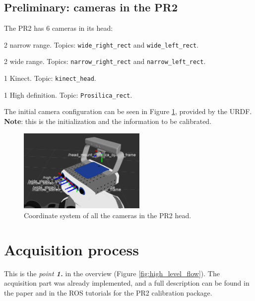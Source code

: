 \subsection*{Preliminary: cameras in the PR2}

The PR2 has 6 cameras in its head:
\begin{itemize*}
 \item 2 narrow range. Topics: \texttt{wide\_right\_rect} and \texttt{wide\_left\_rect}.
 \item 2 wide range. Topics: \texttt{narrow\_right\_rect} and \texttt{narrow\_left\_rect}.
 \item 1 Kinect. Topic: \texttt{kinect\_head}.
 \item 1 High definition. Topic: \texttt{Prosilica\_rect}.
\end{itemize*}

\noindent
The initial camera configuration can be seen in Figure \ref{fig:pr2_cameras}, provided by the URDF. \textbf{Note}: this is the initialization and the information to be calibrated.
\begin{figure}[!htbp]
 \centering
 \includegraphics[width=0.55\textwidth]{images/screenshots/PR2_cameras.png}
 \caption{Coordinate system of all the cameras in the PR2 head.}
 \label{fig:pr2_cameras}
\end{figure}






\section{Acquisition process}
\label{sec:acquisition}

This is the \textit{point \textbf{1.}} in the overview (Figure \ref{fig:high_level_flow}). The acquisition part was already implemented, and a full description can be found in the paper  \cite{pr2_calibration_paper} and in the ROS tutorials for the PR2 calibration package.

%


